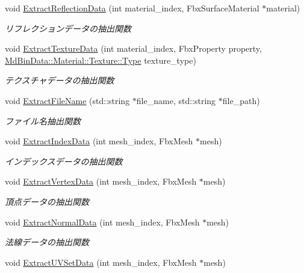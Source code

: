 \begin{DoxyCompactItemize}
void \mbox{\hyperlink{class_fbx_converter_a25d2148fb64c484684c7eb856e9ae255}{Extract\+Reflection\+Data}} (int material\+\_\+index, Fbx\+Surface\+Material $\ast$material)
\begin{DoxyCompactList}\small\item\em リフレクションデータの抽出関数 \end{DoxyCompactList}\item 
void \mbox{\hyperlink{class_fbx_converter_a59039fa4ffde0cbe8fa269e71878b0da}{Extract\+Texture\+Data}} (int material\+\_\+index, Fbx\+Property property, \mbox{\hyperlink{class_md_bin_data_1_1_material_1_1_texture_a30fadb7216d0650de284e2fd875868ae}{Md\+Bin\+Data\+::\+Material\+::\+Texture\+::\+Type}} texture\+\_\+type)
\begin{DoxyCompactList}\small\item\em テクスチャデータの抽出関数 \end{DoxyCompactList}\item 
void \mbox{\hyperlink{class_fbx_converter_ae7d26c94b5926ab4477f93926f6d345d}{Extract\+File\+Name}} (std\+::string $\ast$file\+\_\+name, std\+::string $\ast$file\+\_\+path)
\begin{DoxyCompactList}\small\item\em ファイル名抽出関数 \end{DoxyCompactList}\item 
void \mbox{\hyperlink{class_fbx_converter_a476feb886d898a64f88a0b23cf10651a}{Extract\+Index\+Data}} (int mesh\+\_\+index, Fbx\+Mesh $\ast$mesh)
\begin{DoxyCompactList}\small\item\em インデックスデータの抽出関数 \end{DoxyCompactList}\item 
void \mbox{\hyperlink{class_fbx_converter_adaa3676e36092b4a28a1748ac01dfa75}{Extract\+Vertex\+Data}} (int mesh\+\_\+index, Fbx\+Mesh $\ast$mesh)
\begin{DoxyCompactList}\small\item\em 頂点データの抽出関数 \end{DoxyCompactList}\item 
void \mbox{\hyperlink{class_fbx_converter_a1333d3fe7a3ab69f7121265117e56b7f}{Extract\+Normal\+Data}} (int mesh\+\_\+index, Fbx\+Mesh $\ast$mesh)
\begin{DoxyCompactList}\small\item\em 法線データの抽出関数 \end{DoxyCompactList}\item 
void \mbox{\hyperlink{class_fbx_converter_a06cbfb7a211fc212e74de160e809ef35}{Extract\+U\+V\+Set\+Data}} (int mesh\+\_\+index, Fbx\+Mesh $\ast$mesh)

\end{DoxyCompactItemize}
